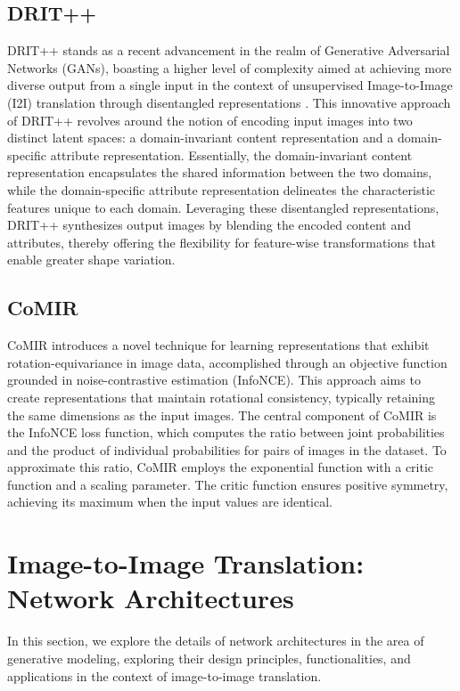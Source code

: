\documentclass[UKenglish,12pt]{master-style}
\begin{document}
\subsection*{DRIT++}

DRIT++ stands as a recent advancement in the realm of Generative Adversarial Networks (GANs), boasting a higher level of complexity aimed at achieving more diverse output from a single input in the context of unsupervised Image-to-Image (I2I) translation through disentangled representations \cite{comparative_study}. This innovative approach of DRIT++ revolves around the notion of encoding input images into two distinct latent spaces: a domain-invariant content representation and a domain-specific attribute representation. Essentially, the domain-invariant content representation encapsulates the shared information between the two domains, while the domain-specific attribute representation delineates the characteristic features unique to each domain. Leveraging these disentangled representations, DRIT++ synthesizes output images by blending the encoded content and attributes, thereby offering the flexibility for feature-wise transformations that enable greater shape variation.

\subsection*{CoMIR}

CoMIR introduces a novel technique for learning representations that exhibit rotation-equivariance in image data, accomplished through an objective function grounded in noise-contrastive estimation (InfoNCE)\cite{comparative_study}. This approach aims to create representations that maintain rotational consistency, typically retaining the same dimensions as the input images. The central component of CoMIR is the InfoNCE loss function, which computes the ratio between joint probabilities and the product of individual probabilities for pairs of images in the dataset. To approximate this ratio, CoMIR employs the exponential function with a critic function and a scaling parameter. The critic function ensures positive symmetry, achieving its maximum when the input values are identical.

\section{Image-to-Image Translation: Network Architectures} 

In this section, we explore the details of network architectures in the area of generative modeling, exploring their design principles, functionalities, and applications in the context of image-to-image translation.
\end{document}
